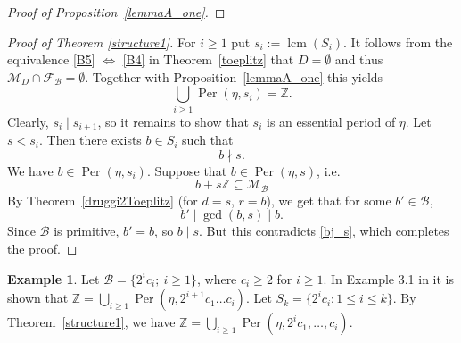 \documentclass[leqno,a4paper,12pt]{article}
\DeclareMathOperator{\lcm}{lcm}
\theoremstyle{definition}
\newtheorem{Example}[Th]{Example}
\newcommand{\divides}{\mid}
\newcommand{\ndivides}{\nmid}
\newcommand{\Per}{\operatorname{Per}\nolimits}
\newcommand{\cf}{{\cal F}}
\newcommand{\cm}{{\cal M}}
\newcommand{\Z}{{\mathbb{Z}}}
\newcommand{\N}{{\mathbb{N}}}
\newcommand{\sB}{\mathscr{B}}
\begin{document}
\begin{proof}[Proof of Proposition~\ref{lemmaA_one}]
\end{proof}

\begin{proof}[Proof of Theorem \ref{structure1}]
For $i\geq1$ put $s_i:=\lcm(S_i)$. It follows from the equivalence \eqref{B5} $\Leftrightarrow$ \eqref{B4} in Theorem~\ref{toeplitz} that $D=\emptyset$ and thus $\mathcal{M}_D\cap \mathcal{F}_\sB=\emptyset$. Together with Proposition~\ref{lemmaA_one} this yields
\[
\bigcup_{i\geq1}\Per(\eta,s_i)=\Z.
\]
Clearly, $s_i\divides s_{i+1}$, so it remains to show that $s_i$ is an essential period of $\eta$.
Let $s<s_i$. Then there exists $b\in S_i$ such that
\begin{equation}\label{bj_s}
b \ndivides s.
\end{equation}
We have $b \in \operatorname{Per}(\eta,s_i)$. Suppose that $b\in \operatorname{Per}(\eta, s)$, i.e.\
\[
b+s \mathbb{Z} \subseteq \mathcal{M}_{\mathscr{B}}
\]
By Theorem~\ref{druggi2Toeplitz} (for $d=s$, $r=b$), we get that for some $b' \in \mathscr{B}$,
\[
b' \divides \gcd(b,s)\divides b.
\]
Since $\mathscr{B}$ is primitive, $b'=b$, so $b\divides s$. But this contradicts \eqref{bj_s}, which completes the proof.
\end{proof}
\begin{Example}
Let $\sB=\{2^ic_i;\ i\geq 1\}$, where $c_i\geq 2$ for $i\geq 1$. In Example 3.1 in \cite{MR3803141} it is shown that $\Z=\bigcup_{i\geq1}\Per(\eta,2^{i+1}c_1\ldots c_i)$. Let $S_k=\{2^ic_i: 1\leq i\leq k\}$. By Theorem~\ref{structure1}, we have $\Z=\bigcup_{i\geq1}\Per(\eta,2^ic_1,\ldots,c_i)$.
\end{Example}
\end{document}
